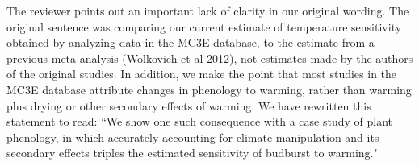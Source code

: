 \documentclass[11pt,a4paper]{letter}
\begin{document}
\begin{letter}{}
\par The reviewer points out an important lack of clarity in our original wording. The original sentence was comparing our current estimate of temperature sensitivity obtained by analyzing data in the MC3E database, to the estimate from a previous meta-analysis (Wolkovich et al 2012), not estimates made by the authors of the original studies.  In addition, we make the point that most studies in the MC3E database attribute changes in phenology to warming, rather than warming plus drying or other secondary effects of warming. We have rewritten this statement to read: ``We show one such consequence with a case study of plant phenology, in which accurately accounting for climate manipulation and its secondary effects triples the estimated sensitivity of budburst to warming."  

\\


\end{letter}
\end{document}
